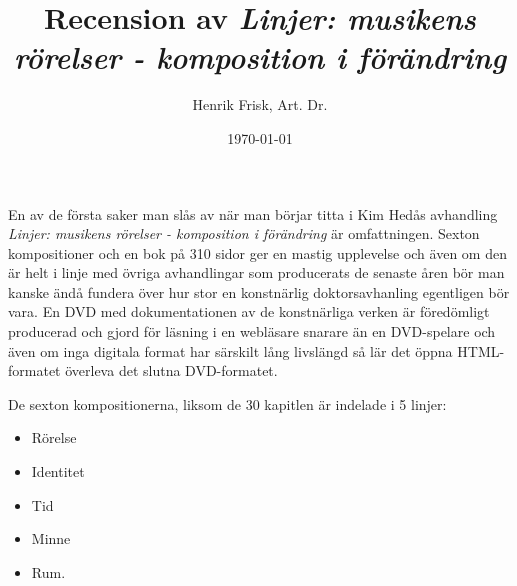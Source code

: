 \documentclass[a4paper]{article}
\title{Recension av \emph{Linjer: musikens rörelser - komposition i förändring}}
\author{Henrik Frisk, Art. Dr.}
\date{\today}
\begin{document}
\maketitle

\noindent
En av de första saker man slås av när man börjar titta i Kim Hedås avhandling \emph{Linjer: musikens rörelser - komposition i förändring} är omfattningen. Sexton kompositioner och en bok på 310 sidor ger en mastig upplevelse och även om den är helt i linje med övriga avhandlingar som producerats de senaste åren bör man kanske ändå fundera över hur stor en konstnärlig doktorsavhanling egentligen bör vara. En DVD med dokumentationen av de konstnärliga verken är föredömligt producerad och gjord för läsning i en webläsare snarare än en DVD-spelare och även om inga digitala format har särskilt lång livslängd så lär det öppna HTML-formatet överleva det slutna DVD-formatet. 

De sexton kompositionerna, liksom de 30 kapitlen är indelade i 5 linjer: 

\begin{itemize}
\item Rörelse
\item Identitet
\item Tid
\item Minne
\item Rum.
\end{itemize}
\end{document}
